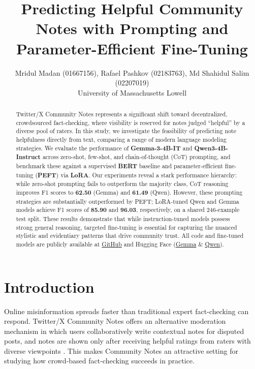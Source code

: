 \documentclass[11pt]{article}
\title{Predicting Helpful Community Notes with Prompting and Parameter-Efficient Fine-Tuning}
\author{
	Mridul Madan (01667156), Rafael Pashkov (02183763), Md Shahidul Salim (02207019) \\
	University of Massachusetts Lowell
}
\begin{document}
	\maketitle
	
	\begin{abstract}
		Twitter/X Community Notes represents a significant shift toward decentralized, crowdsourced fact-checking, where visibility is reserved for notes judged ``helpful'' by a diverse pool of raters. In this study, we investigate the feasibility of predicting note helpfulness directly from text, comparing a range of modern language modeling strategies. We evaluate the performance of \textbf{Gemma-3-4B-IT} and \textbf{Qwen3-4B-Instruct} across zero-shot, few-shot, and chain-of-thought (CoT) prompting, and benchmark these against a supervised \textbf{BERT} baseline and parameter-efficient fine-tuning (\textbf{PEFT}) via \textbf{LoRA}. 
		Our experiments reveal a stark performance hierarchy: while zero-shot prompting fails to outperform the majority class, CoT reasoning improves F1 scores to \textbf{62.50} (Gemma) and \textbf{61.49} (Qwen). However, these prompting strategies are substantially outperformed by PEFT; LoRA-tuned Qwen and Gemma models achieve F1 scores of \textbf{85.90} and \textbf{96.03}, respectively, on a shared 246-example test split. These results demonstrate that while instruction-tuned models possess strong general reasoning, targeted fine-tuning is essential for capturing the nuanced stylistic and evidentiary patterns that drive community trust. All code and fine-tuned models are publicly available at \href{https://github.com/shahidul034/Predicting-Helpful-Community-Notes-with-Prompting-and-Parameter-Efficient-Fine-Tuning}{GitHub} and Hugging Face (\href{https://huggingface.co/shahidul034/gemma-3-4b-it-CommunityNotesEffectiveness}{Gemma} \& \href{https://huggingface.co/shahidul034/qwen3-4b-instruct-2507-CommunityNotesEffectiveness}{Qwen}).
	\end{abstract}
	
	\section{Introduction}
	Online misinformation spreads faster than traditional expert fact-checking can respond. Twitter/X Community Notes offers an alternative moderation mechanism in which users collaboratively write contextual notes for disputed posts, and notes are shown only after receiving helpful ratings from raters with diverse viewpoints \citep{allen2022,saeed2022}. This makes Community Notes an attractive setting for studying how crowd-based fact-checking succeeds in practice.
	
\end{document}
